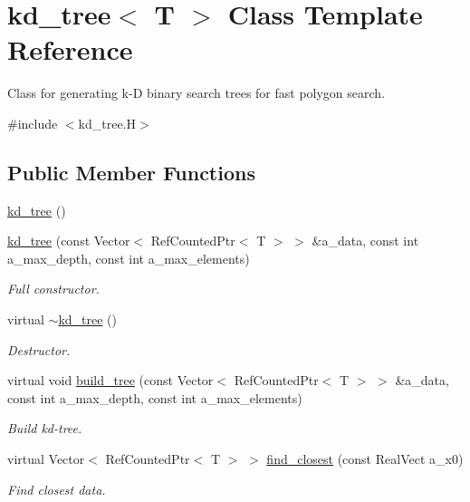 \hypertarget{classkd__tree}{}\section{kd\+\_\+tree$<$ T $>$ Class Template Reference}
\label{classkd__tree}


Class for generating k-\/D binary search trees for fast polygon search.  




{\ttfamily \#include $<$kd\+\_\+tree.\+H$>$}

\subsection*{Public Member Functions}
\begin{DoxyCompactItemize}
\item 
\hyperlink{classkd__tree_a8bd69fa548e21c25e6f6e89535ca2d2f}{kd\+\_\+tree} ()
\item 
\hyperlink{classkd__tree_a1897d70dcc164bcfecdc9b373345ba48}{kd\+\_\+tree} (const Vector$<$ Ref\+Counted\+Ptr$<$ T $>$ $>$ \&a\+\_\+data, const int a\+\_\+max\+\_\+depth, const int a\+\_\+max\+\_\+elements)
\begin{DoxyCompactList}\small\item\em Full constructor. \end{DoxyCompactList}\item 
virtual \hyperlink{classkd__tree_ad3f1855f2938bac1c6c11956b43e9a46}{$\sim$kd\+\_\+tree} ()
\begin{DoxyCompactList}\small\item\em Destructor. \end{DoxyCompactList}\item 
virtual void \hyperlink{classkd__tree_a02ce4dee1ea72279f420fd764100722b}{build\+\_\+tree} (const Vector$<$ Ref\+Counted\+Ptr$<$ T $>$ $>$ \&a\+\_\+data, const int a\+\_\+max\+\_\+depth, const int a\+\_\+max\+\_\+elements)
\begin{DoxyCompactList}\small\item\em Build kd-\/tree. \end{DoxyCompactList}\item 
virtual Vector$<$ Ref\+Counted\+Ptr$<$ T $>$ $>$ \hyperlink{classkd__tree_a55820dd7252935f6328fc6c0e174bb0b}{find\+\_\+closest} (const Real\+Vect a\+\_\+x0)
\begin{DoxyCompactList}\small\item\em Find closest data. \end{DoxyCompactList}\end{DoxyCompactItemize}
